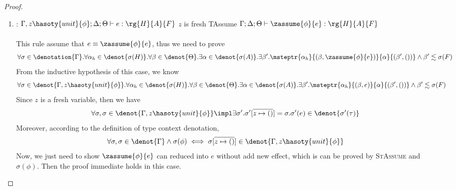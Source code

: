 \begin{proof}
\begin{enumerate}[label=Case]
\item:
{\footnotesize
\mprooftr{60mm}
{$\Gamma, z\hasoty{unit}{\phi};\Delta;\Theta \vdash e : \rg{H}{A}{F}$ \quad $z$ is fresh}
{TAssume}
{$\Gamma;\Delta;\Theta  \vdash \zassume{\phi}{e} : \rg{H}{A}{F}  $}
\ \\ \ \\}
This rule assume that $e \equiv \zassume{\phi}{e}$, thus we need to prove
{\footnotesize\begin{align*}
\forall \sigma \in
    \denotation{\Gamma}. \forall \alpha_h \in \denot{\sigma(H)}.\forall \beta \in \denot{\Theta}. \exists \alpha \in \denot{\sigma(A)}.\exists \beta'. \msteptr{\alpha_h}{(\beta, \zassume{\phi}{e})}{\alpha}{(\beta', ())} \land \beta' \realz \sigma(F)
\end{align*}}\noindent
From the inductive hypothesis of this case, we know
{\footnotesize\begin{align*}
    & \forall \sigma \in \denot{\Gamma, z\hasoty{unit}{\phi}}.\forall \alpha_h \in \denot{\sigma(H)}.\forall \beta \in \denot{\Theta}. \exists \alpha \in \denot{\sigma(A)}.\exists \beta'. \msteptr{\alpha_h}{(\beta, e)}{\alpha}{(\beta', ())} \land \beta' \realz \sigma(F)
\end{align*}}\noindent
Since $z$ is a fresh variable, then we have
{\footnotesize\begin{align*}
    &\forall \sigma, \sigma \in \denot{\Gamma, z\hasoty{unit}{\phi}} \impl \exists \sigma'. \sigma'[\overline{z \mapsto ()}] = \sigma. \sigma'(e) \in \denot{\sigma'(\tau)}
\end{align*}}\noindent
Moreover, according to the definition of type context denotation,
{\footnotesize\begin{align*}
    &\forall \sigma, \sigma \in \denot{\Gamma} \land \sigma(\phi) \iff \sigma[\overline{z \mapsto ()}] \in \denot{\Gamma, z\hasoty{unit}{\phi}}
\end{align*}}\noindent
Now, we just need to show $\zassume{\phi}{e}$ can reduced into $e$ without add new effect, which is can be proved by \textsc{StAssume} and $\sigma(\phi)$. Then the proof immediate holds in this case.


\end{enumerate}
\end{proof}
